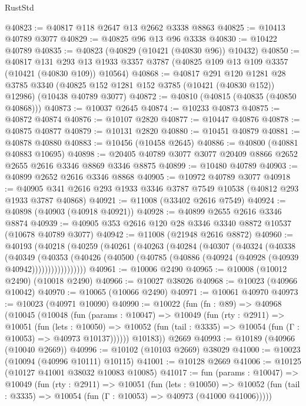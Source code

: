 \begin{lexlean}{RustStd}
\begin{coremodule}
@40823 := @40817 @118 @2647 @13 @2662 @3338 @8863
@40825 := @10413 @40789 @3077
@40829 := @40825 @96 @13 @96 @3338
@40830 := @10422 @40789
@40835 := @40823 (@40829 (@10421 (@40830 @96)) @10432)
@40850 := @40817
    @131
    @293
    @13
    @1933
    @3357
    @3787
    (@40825 @109 @13 @109 @3357 (@10421 (@40830 @109)) @10564)
@40868 := @40817
    @291
    @120
    @1281
    @28
    @3785
    @3340
    (@40825 @152 @1281 @152 @3785 (@10421 (@40830 @152)) @12986)
    (@10438 @40789 @3077)
@40872 := @40810 (@40815 (@40835 (@40850 @40868)))
@40873 := @10037 @2645
@40874 := @10233 @40873
@40875 := @40872 @40874
@40876 := @10107 @2820
@40877 := @10447 @40876
@40878 := @40875 @40877
@40879 := @10131 @2820
@40880 := @10451 @40879
@40881 := @40878 @40880
@40883 := @10456 (@10458 @2645)
@40886 := @40800 (@40881 @40883 @10695)
@40898 := @20405 @40789 @3077 @3077 @20409 @8866 @2652 @2655 @2616 @3346 @8869 @3346 @8875
@40899 := @10480 @40789
@40903 := @40899 @2652 @2616 @3346 @8868
@40905 := @10972 @40789 @3077
@40918 := @40905 @341 @2616 @293 @1933 @3346 @3787 @7549 @10538 (@40812 @293 @1933 @3787 @40868)
@40921 := @11008 (@33402 @2616 @7549)
@40924 := @40898 (@40903 (@40918 @40921))
@40928 := @40899 @2655 @2616 @3346 @8874
@40939 := @40905 @353 @2616 @120 @28 @3346 @3340 @8872 @10537 (@10678 @40789 @3077)
@40942 := @11008 (@21948 @2616 @8872)
@40960 := @40193
    (@40218
      (@40259
        (@40261
          (@40263
            (@40284
              (@40307
                (@40324
                  (@40338
                    (@40349
                      (@40353
                        (@40426
                          (@40500 (@40785 (@40886 (@40924 (@40928 (@40939 @40942)))))))))))))))))
@40961 := @10006 @2490
@40965 := @10008 (@10012 @2490) (@10018 @2490)
@40966 := @10027 @38026
@40968 := @10023 (@40966 @10042)
@40970 := @10065 (@10066 @2490)
@40971 := @10061 @40970
@40973 := @10023 (@40971 @10090)
@40990 := @10022
    (fun (fn : @89) =>
    @40968
      (@10045
        (@10048
          (fun (params : @10047) =>
          @10049
            (fun (rty : @2911) =>
            @10051
              (fun (lets : @10050) =>
              @10052 (fun (tail : @3335) => @10054 (fun (Γ : @10053) => @40973 @10137))))))
        @10183))
    @2669
@40993 := @10189 (@40966 (@10040 @2669))
@40996 := @10102 (@10103 @2669) @38029
@41000 := @10023 (@10094 (@40996 @10111) @10115)
@41001 := @10128 @2669
@41006 := @10125 (@10127 @41001 @38032 @10083 @10085)
@41017 := fun (params : @10047) =>
  @10049
    (fun (rty : @2911) =>
    @10051
      (fun (lets : @10050) =>
      @10052 (fun (tail : @3335) => @10054 (fun (Γ : @10053) => @40973 (@41000 @41006)))))

\end{coremodule}
\end{lexlean}
